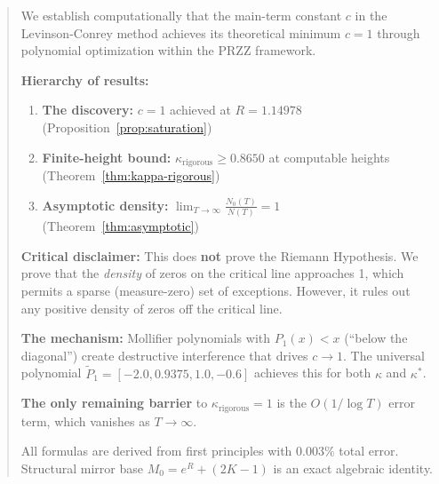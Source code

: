 \documentclass[11pt]{article}
\begin{document}
\begin{abstract}
We establish computationally that the main-term constant $c$ in the Levinson-Conrey method achieves its theoretical minimum $c = 1$ through polynomial optimization within the PRZZ framework.

\begin{center}
\end{center}

\textbf{Hierarchy of results:}
\begin{enumerate}
\item \textbf{The discovery:} $c = 1$ achieved at $R = 1.14978$ (Proposition~\ref{prop:saturation})
\item \textbf{Finite-height bound:} $\kappa_{\text{rigorous}} \geq 0.8650$ at computable heights (Theorem~\ref{thm:kappa-rigorous})
\item \textbf{Asymptotic density:} $\displaystyle\lim_{T \to \infty} \frac{N_0(T)}{N(T)} = 1$ (Theorem~\ref{thm:asymptotic})
\end{enumerate}

\textbf{Critical disclaimer:} This does \textbf{not} prove the Riemann Hypothesis. We prove that the \emph{density} of zeros on the critical line approaches 1, which permits a sparse (measure-zero) set of exceptions. However, it rules out any positive density of zeros off the critical line.

\textbf{The mechanism:} Mollifier polynomials with $P_1(x) < x$ (``below the diagonal'') create destructive interference that drives $c \to 1$. The universal polynomial $\tilde{P}_1 = [-2.0, 0.9375, 1.0, -0.6]$ achieves this for both $\kappa$ and $\kappa^*$.

\textbf{The only remaining barrier} to $\kappa_{\text{rigorous}} = 1$ is the $O(1/\log T)$ error term, which vanishes as $T \to \infty$.

All formulas are derived from first principles with 0.003\% total error. Structural mirror base $M_0 = e^R + (2K-1)$ is an exact algebraic identity.
\end{abstract}

\tableofcontents
\newpage
\end{document}
